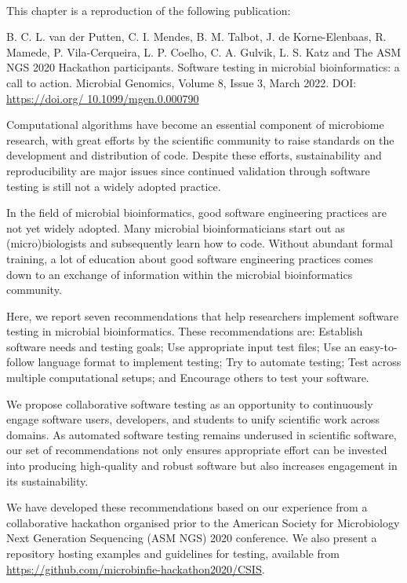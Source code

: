 \mbox{}\\
\vspace{8cm}

This chapter is a reproduction of the following publication:

B. C. L. van der Putten, C. I. Mendes, B. M. Talbot, J. de Korne-Elenbaas, R. Mamede, P. Vila-Cerqueira, L. P. Coelho, C. A. Gulvik, L. S. Katz and The ASM NGS 2020 Hackathon participants. Software testing in microbial bioinformatics: a call to action. Microbial Genomics, Volume 8, Issue 3, March 2022. DOI: \url{https://doi.org/ 10.1099/mgen.0.000790}

Computational algorithms have become an essential component of microbiome research, with great efforts by the scientific community to raise standards on the development and distribution of code. Despite these efforts, sustainability and reproducibility are major issues since continued validation through software testing is still not a widely adopted practice.  

In the field of microbial bioinformatics, good software engineering practices are not yet widely adopted. Many microbial bioinformaticians start out as (micro)biologists and subsequently learn how to code. Without abundant formal training, a lot of education about good software engineering practices comes down to an exchange of information within the microbial bioinformatics community. 

Here, we report seven recommendations that help researchers implement software testing in microbial bioinformatics. These recommendations are: Establish software needs and testing goals; Use appropriate input test files; Use an easy-to-follow language format to implement testing; Try to automate testing; Test across multiple computational setups; and Encourage others to test your software.

We propose collaborative software testing as an opportunity to continuously engage software users, developers, and students to unify scientific work across domains. As automated software testing remains underused in scientific software, our set of recommendations not only ensures appropriate effort can be invested into producing high-quality and robust software but also increases engagement in its sustainability.

We have developed these recommendations based on our experience from a collaborative hackathon organised prior to the American Society for Microbiology Next Generation Sequencing (ASM NGS) 2020 conference. We also present a repository hosting examples and guidelines for testing, available from \url{https://github.com/microbinfie-hackathon2020/CSIS}.

